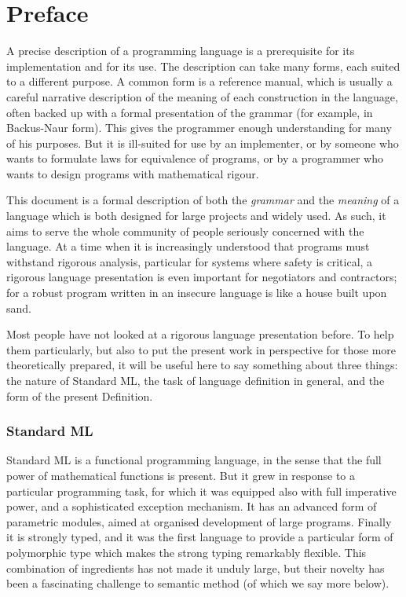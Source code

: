 \section*{Preface}
A precise description of a programming language is a prerequisite for its 
implementation and for its use.  The description can take many forms, 
each suited to a different purpose.  A common form is a reference manual,
which is usually a careful narrative description of the meaning of each
construction in the language, often backed up with a formal presentation
of the grammar (for example, in Backus-Naur form). 
This gives the programmer enough 
understanding for many of his purposes.  But it is ill-suited for use
by an implementer, or by someone who wants to formulate laws for
equivalence of programs, or by a programmer who wants to design programs with
mathematical rigour. 

This document is a formal description of both the {\sl grammar} and the
{\sl meaning} of a language which is both designed for large projects and
widely used.  As such, it aims to serve the whole community of people
seriously concerned with the language.  At a time when it is increasingly
understood that programs must withstand rigorous analysis, particular for 
systems where safety is critical, a rigorous language presentation is even
important for negotiators and contractors; for a robust program
written in an insecure language is like a house built upon sand.


Most people have not looked at a rigorous language presentation before.
To help them particularly, but also to put the present work in perspective
for those more theoretically prepared,  it will be useful here to say something
about three things: the nature of Standard ML, the task of language definition 
in general, and the form of the present Definition.

\subsubsection*{Standard ML}
Standard ML is a functional programming language, in the sense that the
full power of mathematical functions is present.  But it grew in response
to a particular programming task, for which it was equipped also
with full imperative power, and a sophisticated exception mechanism.  
It has an advanced form of parametric modules, aimed at organised
development of large programs.  Finally it is strongly typed, and it was
the first language to provide a particular form of polymorphic type which 
makes the strong typing remarkably flexible.  This combination of
ingredients has not made it unduly large, but their novelty has been
a fascinating challenge to semantic method (of which we say more below).
 
